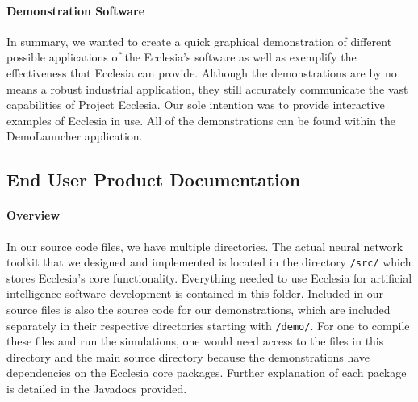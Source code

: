 \documentclass[letterpaper, 10pt]{article}
\begin{document}
		\paragraph{Demonstration Software} In summary, we wanted to create a quick graphical demonstration of different possible applications of the Ecclesia's software as well as exemplify the effectiveness that Ecclesia can provide. Although the demonstrations are by no means a robust industrial application, they still accurately communicate the vast capabilities of Project Ecclesia. Our sole intention was to provide interactive examples of Ecclesia in use. All of the demonstrations can be found within the DemoLauncher application.
	
	\clearpage
	\subsection{End User Product Documentation}
		\paragraph{Overview}
		In our source code files, we have multiple directories. The actual neural network toolkit that we designed and implemented is located in the directory \texttt{/src/} which stores Ecclesia's core functionality. Everything needed to use Ecclesia for artificial intelligence software development is contained in this folder. Included in our source files is also the source code for our demonstrations, which are included separately in their respective directories starting with \texttt{/demo/}. For one to compile these files and run the simulations, one would need access to the files in this directory and the main source directory because the demonstrations have dependencies on the Ecclesia core packages. Further explanation of each package is detailed in the Javadocs provided.
		
\end{document}
